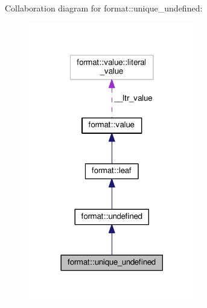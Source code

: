Collaboration diagram for format\+:\+:unique\+\_\+undefined\+:
\nopagebreak
\begin{figure}[H]
\begin{center}
\leavevmode
\includegraphics[width=206pt]{classformat_1_1unique__undefined__coll__graph}
\end{center}
\end{figure}
